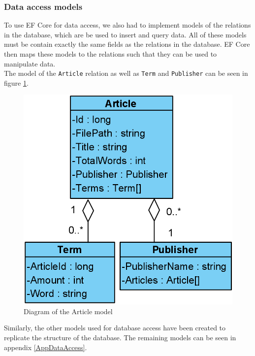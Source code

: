 \subsubsection*{Data access models}
To use EF Core for data access, we also had to implement models of the relations in the database, which are be used to insert and query data. 
All of these models must be contain exactly the same fields as the relations in the database.
EF Core then maps these models to the relations such that they can be used to manipulate data.
\\
The model of the \texttt{Article} relation as well as \texttt{Term} and \texttt{Publisher} can be seen in figure \ref*{Article}. 
\begin{figure}[H]
    \centering
    \includegraphics[scale=0.25]{Images/ArticleModel.PNG}
    \caption{Diagram of the Article model}
    \label{Article}
\end{figure}
Similarly, the other models used for database access have been created to replicate the structure of the database. 
The remaining models can be seen in appendix \ref*{AppDataAccess}.